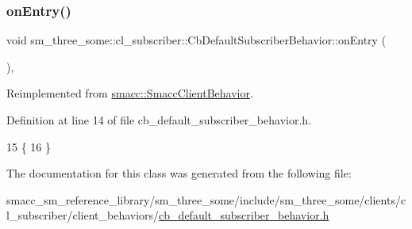 \subsubsection{\texorpdfstring{on\+Entry()}{onEntry()}}
{\footnotesize\ttfamily void sm\+\_\+three\+\_\+some\+::cl\+\_\+subscriber\+::\+Cb\+Default\+Subscriber\+Behavior\+::on\+Entry (\begin{DoxyParamCaption}{ }\end{DoxyParamCaption})\hspace{0.3cm}{\ttfamily [inline]}, {\ttfamily [virtual]}}



Reimplemented from \hyperlink{classsmacc_1_1SmaccClientBehavior_ad5d3e1f1697c3cfe66c94cadba948493}{smacc\+::\+Smacc\+Client\+Behavior}.



Definition at line 14 of file cb\+\_\+default\+\_\+subscriber\+\_\+behavior.\+h.


\begin{DoxyCode}
15     \{
16     \}
\end{DoxyCode}


The documentation for this class was generated from the following file\+:\begin{DoxyCompactItemize}
\item 
smacc\+\_\+sm\+\_\+reference\+\_\+library/sm\+\_\+three\+\_\+some/include/sm\+\_\+three\+\_\+some/clients/cl\+\_\+subscriber/client\+\_\+behaviors/\hyperlink{sm__three__some_2include_2sm__three__some_2clients_2cl__subscriber_2client__behaviors_2cb__default__subscriber__behavior_8h}{cb\+\_\+default\+\_\+subscriber\+\_\+behavior.\+h}\end{DoxyCompactItemize}
